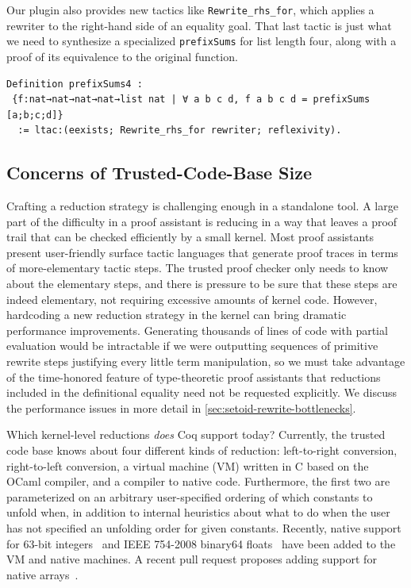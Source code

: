 Our plugin also provides new tactics like \texttt{Rewrite_rhs_for}, which applies a rewriter to the right-hand side of an equality goal.
That last tactic is just what we need to synthesize a specialized \texttt{prefixSums} for list length four, along with a proof of its equivalence to the original function.
\begin{verbatim}
Definition prefixSums4 :
 {f:nat→nat→nat→nat→list nat | ∀ a b c d, f a b c d = prefixSums [a;b;c;d]}
  := ltac:(eexists; Rewrite_rhs_for rewriter; reflexivity).
\end{verbatim}


\subsection{Concerns of Trusted-Code-Base Size} \label{sec:trusted-code-base-size}

Crafting a reduction strategy is challenging enough in a standalone tool.
A large part of the difficulty in a proof assistant is reducing in a way that leaves a proof trail that can be checked efficiently by a small kernel.
Most proof assistants present user-friendly surface tactic languages that generate proof traces in terms of more-elementary tactic steps.
The trusted proof checker only needs to know about the elementary steps, and there is pressure to be sure that these steps are indeed elementary, not requiring excessive amounts of kernel code.
However, hardcoding a new reduction strategy in the kernel can bring dramatic performance improvements.
Generating thousands of lines of code with partial evaluation would be intractable if we were outputting sequences of primitive rewrite steps justifying every little term manipulation, so we must take advantage of the time-honored feature of type-theoretic proof assistants that reductions included in the definitional equality need not be requested explicitly.
We discuss the performance issues in more detail in \autoref{sec:setoid-rewrite-bottlenecks}.

Which kernel-level reductions \emph{does} Coq support today?
Currently, the trusted code base knows about four different kinds of reduction: left-to-right conversion, right-to-left conversion, a virtual machine (VM) written in C based on the OCaml compiler, and a compiler to native code.
Furthermore, the first two are parameterized on an arbitrary user-specified ordering of which constants to unfold when, in addition to internal heuristics about what to do when the user has not specified an unfolding order for given constants.
Recently, native support for 63-bit integers~\cite{coq-pr-int63} and IEEE 754-2008 binary64 floats~\cite{coq-pr-floats} have been added to the VM and native machines.
A recent pull request proposes adding support for native arrays~\cite{coq-pr-parray}.

